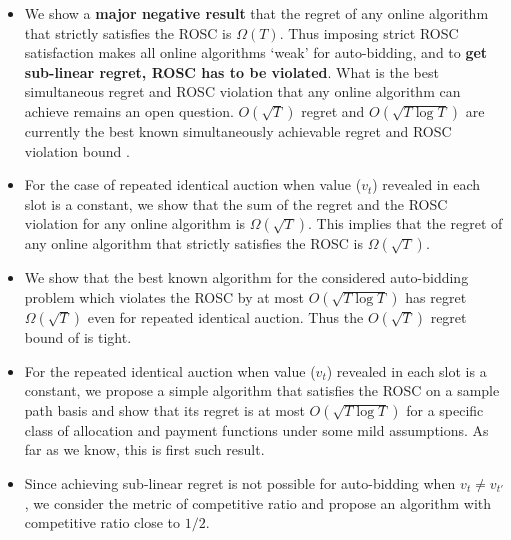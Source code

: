 \begin{itemize}
\item We show a {\bf major negative result} that the regret of any online algorithm that strictly satisfies the ROSC is $\Omega(T)$. Thus imposing strict ROSC satisfaction makes 
all online algorithms `weak' for auto-bidding, and to {\bf get sub-linear regret, ROSC has to be violated}. What is the best simultaneous regret and ROSC violation that any online algorithm can achieve remains an open question. $O(\sqrt{T})$ regret and $O(\sqrt{T \log T})$ are currently the best known simultaneously achievable regret and ROSC violation bound \cite{Feng}.
\item For the case of repeated identical auction when value ($v_t$) revealed in each slot is a constant, we show that the sum of the regret and the ROSC 
violation for any online algorithm is $\Omega(\sqrt{T})$. This implies that  the regret of any online algorithm that strictly satisfies the ROSC is $\Omega(\sqrt{T})$.
\item We show that the best known algorithm \cite{Feng} for the considered auto-bidding problem which violates the ROSC by at most $O(\sqrt{T\log T})$ has regret $\Omega(\sqrt{T})$ even for repeated identical auction. Thus the $O(\sqrt{T})$ regret bound of \cite{Feng} is tight.

\item For the repeated identical auction when value ($v_t$) revealed in each slot is a constant, we propose a simple algorithm that satisfies the ROSC on a sample path basis and show that its regret is at most $O(\sqrt{T \log T})$ for a specific class of allocation and payment functions under some mild assumptions. As far as we know, this is first such result.

\item Since achieving sub-linear regret is not possible for auto-bidding when $v_t\ne v_{t'}$,  
we consider the metric of competitive ratio and propose an algorithm with competitive ratio close to $1/2$.
\end{itemize}


